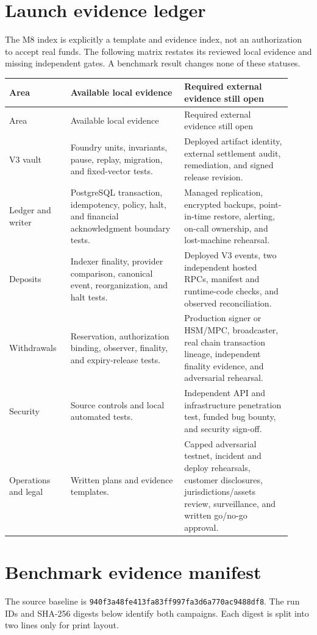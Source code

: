 \documentclass[envcountsame,runningheads,notitlepage]{llncs}
\begin{document}
\section{Launch evidence ledger}
The M8 index is explicitly a template and evidence index, not an authorization to accept real funds. The following matrix restates its reviewed local evidence and missing independent gates. A benchmark result changes none of these statuses.\cite{m8}
\small
\begin{longtable}{p{0.20\linewidth}p{0.37\linewidth}p{0.35\linewidth}}
\toprule
Area & Available local evidence & Required external evidence still open \\
\midrule\endfirsthead
\toprule Area & Available local evidence & Required external evidence still open \\
\midrule\endhead
V3 vault & Foundry units, invariants, pause, replay, migration, and fixed-vector tests. & Deployed artifact identity, external settlement audit, remediation, and signed release revision. \\
Ledger and writer & PostgreSQL transaction, idempotency, policy, halt, and financial acknowledgment boundary tests. & Managed replication, encrypted backups, point-in-time restore, alerting, on-call ownership, and lost-machine rehearsal. \\
Deposits & Indexer finality, provider comparison, canonical event, reorganization, and halt tests. & Deployed V3 events, two independent hosted RPCs, manifest and runtime-code checks, and observed reconciliation. \\
Withdrawals & Reservation, authorization binding, observer, finality, and expiry-release tests. & Production signer or HSM/MPC, broadcaster, real chain transaction lineage, independent finality evidence, and adversarial rehearsal. \\
Security & Source controls and local automated tests. & Independent API and infrastructure penetration test, funded bug bounty, and security sign-off. \\
Operations and legal & Written plans and evidence templates. & Capped adversarial testnet, incident and deploy rehearsals, customer disclosures, jurisdictions/assets review, surveillance, and written go/no-go approval. \\
\bottomrule
\end{longtable}
\normalsize

\section{Benchmark evidence manifest}\label{app:bench-record}
The source baseline is \texttt{940f3a48fe413fa83ff997fa3d6a770ac9488df8}. The run IDs and SHA-256 digests below identify both campaigns. Each digest is split into two lines only for print layout.
\end{document}
